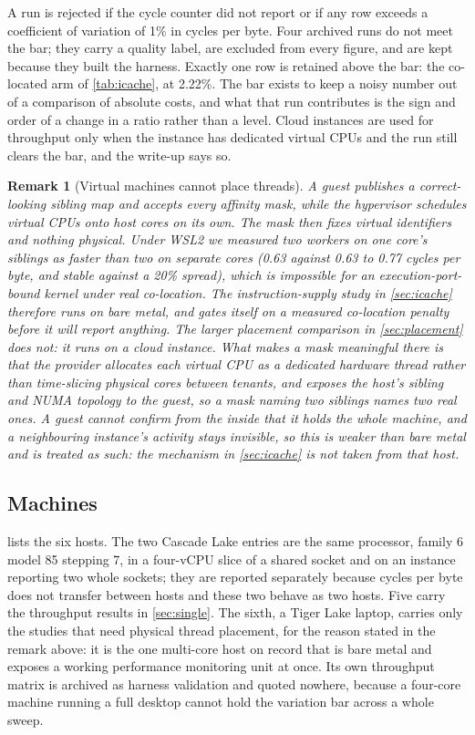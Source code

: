 \documentclass[acmsmall,screen,review]{acmart}
\theoremstyle{acmdefinition}
\newtheorem{remark}{Remark}
\begin{document}
A run is rejected if the cycle counter did not report or if any row exceeds a
coefficient of variation of 1\% in cycles per byte. Four archived runs do not
meet the bar; they carry a quality label, are excluded from every figure, and
are kept because they built the harness. Exactly one row is retained above the
bar: the co-located arm of \cref{tab:icache}, at 2.22\%. The bar exists to keep
a noisy number out of a comparison of absolute costs, and what that run
contributes is the sign and order of a change in a ratio rather than a level.
Cloud instances are used for throughput only when the instance has dedicated
virtual CPUs and the run still clears the bar, and the write-up says so.

\begin{remark}[Virtual machines cannot place threads]
A guest publishes a correct-looking sibling map and accepts every affinity
mask, while the hypervisor schedules virtual CPUs onto host cores on its own.
The mask then fixes virtual identifiers and nothing physical. Under WSL2 we
measured two workers on one core's siblings as \emph{faster} than two on
separate cores (0.63 against 0.63 to 0.77 cycles per byte, and stable against a
20\% spread), which is impossible for an execution-port-bound kernel under real
co-location. The instruction-supply study in \cref{sec:icache} therefore runs on
bare metal, and gates itself on a measured co-location penalty before it will
report anything. The larger placement comparison in \cref{sec:placement} does
not: it runs on a cloud instance. What makes a mask meaningful there is that the
provider allocates each virtual CPU as a dedicated hardware thread rather than
time-slicing physical cores between tenants, and exposes the host's sibling and
NUMA topology to the guest, so a mask naming two siblings names two real ones.
A guest cannot confirm from the inside that it holds the whole machine, and a
neighbouring instance's activity stays invisible, so this is weaker than bare
metal and is treated as such: the mechanism in \cref{sec:icache} is not taken
from that host.
\end{remark}

\subsection{Machines}

 lists the six hosts. The two Cascade Lake entries are the
same processor, family 6 model 85 stepping 7, in a four-vCPU slice of a shared
socket and on an instance reporting two whole sockets; they are reported
separately because cycles per byte does not transfer between hosts and these two
behave as two hosts. Five carry the throughput results in \cref{sec:single}. The
sixth, a Tiger Lake laptop, carries only the studies that need physical thread
placement, for the reason stated in the remark above: it is the one multi-core
host on record that is bare metal and exposes a working performance monitoring
unit at once. Its own throughput matrix is archived as harness validation and
quoted nowhere, because a four-core machine running a full desktop cannot hold
the variation bar across a whole sweep.
\end{document}
